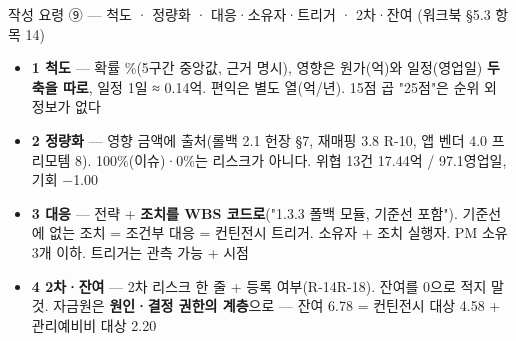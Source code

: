 \begin{frame}{작성 요령 ⑨ — 척도 · 정량화 · 대응·소유자·트리거 · 2차·잔여 (워크북 §5.3 항목 1\til{}4)}
\begin{itemize}
\item \textbf{1 척도} — 확률 \%(5구간 중앙값, 근거 명시), 영향은 원가(억)와 일정(영업일) \textbf{두 축을 따로}, 일정 1일 ≈ 0.14억. 편익은 별도 열(억/년). 1\til{}5점 곱 "25점"은 순위 외 정보가 없다
\item \textbf{2 정량화} — 영향 금액에 출처(롤백 2.1 헌장 §7, 재매핑 3.8 R-10, 앱 벤더 4.0 프리모템 8). 100\%(이슈)·0\%는 리스크가 아니다. 위협 13건 17.44억 / 97.1영업일, 기회 $-$1.00
\item \textbf{3 대응} — 전략 + \textbf{조치를 WBS 코드로}("1.3.3 폴백 모듈, 기준선 포함"). 기준선에 없는 조치 = 조건부 대응 = 컨틴전시 트리거. 소유자 + 조치 실행자. PM 소유 3개 이하. 트리거는 관측 가능 + 시점
\item \textbf{4 2차·잔여} — 2차 리스크 한 줄 + 등록 여부(R-14\til{}R-18). 잔여를 0으로 적지 말 것. 자금원은 \textbf{원인·결정 권한의 계층}으로 — 잔여 6.78 = 컨틴전시 대상 4.58 + 관리예비비 대상 2.20
\end{itemize}
\end{frame}

